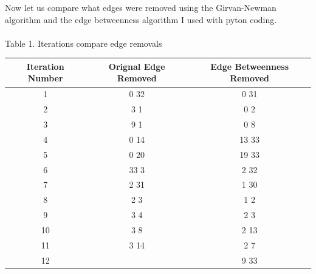 \documentclass[10pt,letterpaper]{article}
\begin{document}
Now let us compare what edges were removed using the Girvan-Newman algorithm and the edge betweenness algorithm I used with pyton coding.\\
\\
Table 1. Iterations compare edge removals\\
\begin{center}
  \begin{tabular}{ | c | c | c }
    \hline
     Iteration Number & Orignal Edge Removed & Edge Betweenness Removed\\ \hline
     1 & 0 32 & 0 31\\ \hline
     2 & 3 1 & 0 2 \\ \hline
     3 & 9 1 & 0 8 \\ \hline
     4 & 0 14 & 13 33 \\ \hline
     5 & 0 20 & 19 33 \\ \hline
     6 & 33 3 & 2 32\\ \hline
     7 & 2 31 & 1 30\\ \hline
     8 & 2 3 & 1 2\\ \hline
     9 & 3 4 & 2 3\\ \hline
     10 & 3 8 & 2 13\\ \hline
     11 & 3 14 & 2 7\\ \hline
     12 &  & 9 33\\ \hline
    \hline
  \end{tabular}
\end{center}
 
\end{document}
